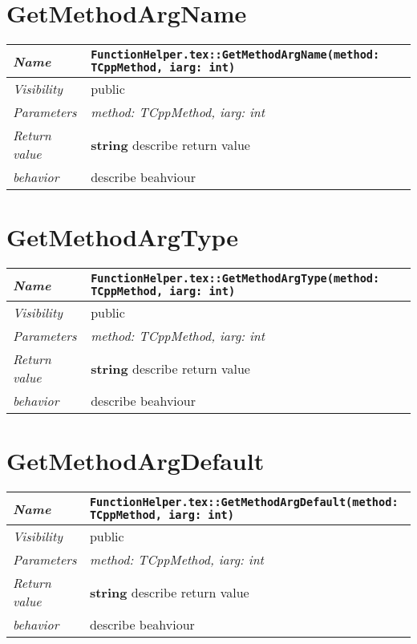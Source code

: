  \section{GetMethodArgName}
\begin{longtable}{p{3cm} @{\hskip 1cm} p{12cm}}
 \hline
\textit{Name} & \texttt{FunctionHelper.tex::GetMethodArgName(method: TCppMethod, iarg: int)}\\
\hline
 \textit{Visibility} & public\\
\hline
\textit{Parameters} & \textit{method: TCppMethod, iarg: int}\\
\hline
\textit{Return value} & \textbf{ string} describe return value\\
  \hline
 \textit{behavior} & describe beahviour \\
\hline
\end{longtable} \pagebreak
 \section{GetMethodArgType}
\begin{longtable}{p{3cm} @{\hskip 1cm} p{12cm}}
 \hline
\textit{Name} & \texttt{FunctionHelper.tex::GetMethodArgType(method: TCppMethod, iarg: int)}\\
\hline
 \textit{Visibility} & public\\
\hline
\textit{Parameters} & \textit{method: TCppMethod, iarg: int}\\
\hline
\textit{Return value} & \textbf{ string} describe return value\\
  \hline
 \textit{behavior} & describe beahviour \\
\hline
\end{longtable} \pagebreak
 \section{GetMethodArgDefault}
\begin{longtable}{p{3cm} @{\hskip 1cm} p{12cm}}
 \hline
\textit{Name} & \texttt{FunctionHelper.tex::GetMethodArgDefault(method: TCppMethod, iarg: int)}\\
\hline
 \textit{Visibility} & public\\
\hline
\textit{Parameters} & \textit{method: TCppMethod, iarg: int}\\
\hline
\textit{Return value} & \textbf{ string} describe return value\\
  \hline
 \textit{behavior} & describe beahviour \\
\hline
\end{longtable} \pagebreak
